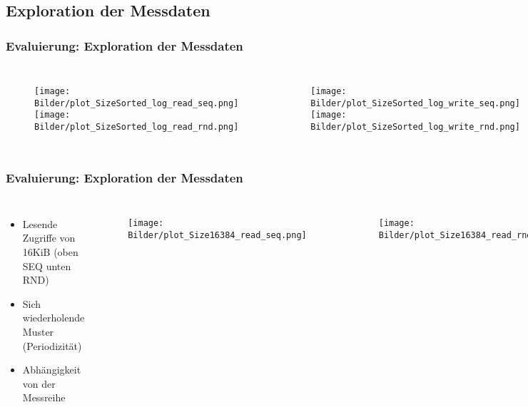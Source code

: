 \documentclass{beamer}
\begin{document}
\subsection{Exploration der Messdaten}
\begin{frame}
\frametitle{Evaluierung: Exploration der Messdaten}
\begin{columns}
	\begin{figure}
		\texttt{[image: Bilder/plot\_SizeSorted\_log\_read\_seq.png]}\\
		\texttt{[image: Bilder/plot\_SizeSorted\_log\_read\_rnd.png]}
	\end{figure}
	\begin{figure}
		\texttt{[image: Bilder/plot\_SizeSorted\_log\_write\_seq.png]}\\
		\texttt{[image: Bilder/plot\_SizeSorted\_log\_write\_rnd.png]}
	\end{figure}
\end{columns}
\end{frame}

\begin{frame}
\frametitle{Evaluierung: Exploration der Messdaten}
\begin{columns}
\begin{itemize}
	\item Lesende Zugriffe von 16KiB (oben SEQ unten RND)
	\item Sich wiederholende Muster (Periodizität)
	\item Abhängigkeit von der Messreihe
\end{itemize}
	\begin{figure}
		\texttt{[image: Bilder/plot\_Size16384\_read\_seq.png]}
	\end{figure}
	\begin{figure}
		\texttt{[image: Bilder/plot\_Size16384\_read\_rnd.png]}
	\end{figure}
\end{columns}
\end{frame}
\end{document}
